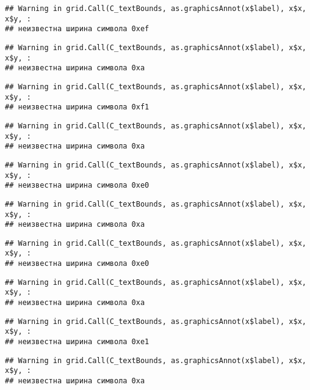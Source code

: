 \documentclass[
]{article}
\begin{document}
\begin{verbatim}
## Warning in grid.Call(C_textBounds, as.graphicsAnnot(x$label), x$x, x$y, :
## неизвестна ширина символа 0xef
\end{verbatim}

\begin{verbatim}
## Warning in grid.Call(C_textBounds, as.graphicsAnnot(x$label), x$x, x$y, :
## неизвестна ширина символа 0xa
\end{verbatim}

\begin{verbatim}
## Warning in grid.Call(C_textBounds, as.graphicsAnnot(x$label), x$x, x$y, :
## неизвестна ширина символа 0xf1
\end{verbatim}

\begin{verbatim}
## Warning in grid.Call(C_textBounds, as.graphicsAnnot(x$label), x$x, x$y, :
## неизвестна ширина символа 0xa
\end{verbatim}

\begin{verbatim}
## Warning in grid.Call(C_textBounds, as.graphicsAnnot(x$label), x$x, x$y, :
## неизвестна ширина символа 0xe0
\end{verbatim}

\begin{verbatim}
## Warning in grid.Call(C_textBounds, as.graphicsAnnot(x$label), x$x, x$y, :
## неизвестна ширина символа 0xa
\end{verbatim}

\begin{verbatim}
## Warning in grid.Call(C_textBounds, as.graphicsAnnot(x$label), x$x, x$y, :
## неизвестна ширина символа 0xe0
\end{verbatim}

\begin{verbatim}
## Warning in grid.Call(C_textBounds, as.graphicsAnnot(x$label), x$x, x$y, :
## неизвестна ширина символа 0xa
\end{verbatim}

\begin{verbatim}
## Warning in grid.Call(C_textBounds, as.graphicsAnnot(x$label), x$x, x$y, :
## неизвестна ширина символа 0xe1
\end{verbatim}

\begin{verbatim}
## Warning in grid.Call(C_textBounds, as.graphicsAnnot(x$label), x$x, x$y, :
## неизвестна ширина символа 0xa
\end{verbatim}
\end{document}
